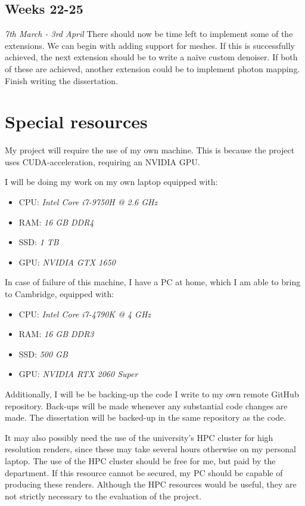 \documentclass[12pt, a4paper]{article}
\newcommand{\newtime}[3]{
    \subsection*{#1}
    \vspace{-\baselineskip}
    \emph{#2}
    \vspace{\baselineskip}
    \newline
    #3
}
\begin{document}
    \newtime{Weeks 22-25}{7th March - 3rd April}{There should now be time left to implement some of the extensions. We can begin with adding support for meshes. If this is successfully achieved, the next extension should be to write a naïve custom denoiser. If both of these are achieved, another extension could be to implement photon mapping. Finish writing the dissertation.}

    \section*{Special resources}
    My project will require the use of my own machine. This is because the project uses CUDA-acceleration, requiring an NVIDIA GPU.

    I will be doing my work on my own laptop equipped with:
    \begin{itemize}
        \setlength\itemsep{0.1em}
        \item CPU: \emph{Intel Core i7-9750H @ 2.6 GHz}
        \item RAM: \emph{16 GB DDR4}
        \item SSD: \emph{1 TB}
        \item GPU: \emph{NVIDIA GTX 1650}
    \end{itemize}
    
    In case of failure of this machine, I have a PC at home, which I am able to bring to Cambridge, equipped with:
    \begin{itemize}
        \setlength\itemsep{0.1em}
        \item CPU: \emph{Intel Core i7-4790K @ 4 GHz}
        \item RAM: \emph{16 GB DDR3}
        \item SSD: \emph{500 GB}
        \item GPU: \emph{NVIDIA RTX 2060 Super}
    \end{itemize}

    Additionally, I will be be backing-up the code I write to my own remote GitHub repository. Back-ups will be made whenever any substantial code changes are made. The dissertation will be backed-up in the same repository as the code.

    It may also possibly need the use of the university’s HPC cluster for high resolution renders, since these may take several hours otherwise on my personal laptop. The use of the HPC cluster should be free for me, but paid by the department. If this resource cannot be secured, my PC should be capable of producing these renders. Although the HPC resources would be useful, they are not strictly necessary to the evaluation of the project.
\end{document}
